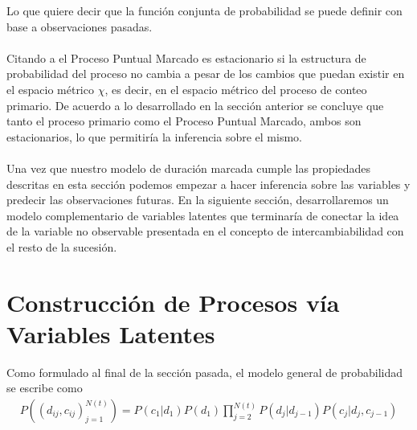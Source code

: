 Lo que quiere decir que la funci\'on conjunta de probabilidad se puede definir con base a observaciones pasadas.\\
\\
Citando a \cite{daley2003} el Proceso Puntual Marcado es estacionario si la estructura de probabilidad del proceso no cambia a pesar de los cambios que puedan existir en el espacio m\'etrico $\chi$, es decir, en el espacio m\'etrico del proceso de conteo primario. De acuerdo a lo desarrollado en la secci\'on anterior se concluye que tanto el proceso primario como el Proceso Puntual Marcado, ambos son estacionarios, lo que permitir\'ia la inferencia sobre el mismo.\\
\\
Una vez que nuestro modelo de duraci\'on marcada cumple las propiedades descritas en esta secci\'on podemos empezar a hacer inferencia sobre las variables y predecir las observaciones futuras. En la siguiente secci\'on, desarrollaremos un modelo complementario de variables latentes que terminar\'ia de conectar la idea de la variable no observable presentada en el concepto de intercambiabilidad con el resto de la sucesi\'on.

\section{Construcci\'on de Procesos v\'ia Variables Latentes}
Como formulado al final de la secci\'on pasada, el modelo general de probabilidad se escribe como
\begin{align*}
P((d_{ij},c_{ij})_{j=1}^{N(t)})= P(c_1|d_1)P(d_1) \prod_{j=2}^{N(t)} P(d_j|d_{j-1})P(c_j|d_j,c_{j-1})
\end{align*}

